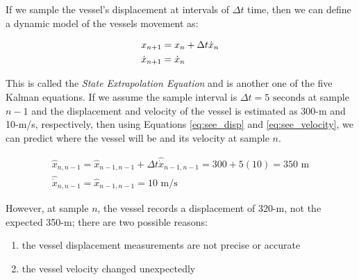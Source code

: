         If we sample the vessel's displacement at intervals of $\Delta t$ time, then we can define a dynamic model of the vessels movement as:

        \begin{subequations}
            \labeq{see_dynamic_model}
            \begin{align}
                x_{n+1} &= x_n + \Delta t \dot{x}_n \labeq{see_disp}\\
                \dot{x}_{n+1} &= \dot{x}_n \labeq{see_velocity}
            \end{align}
        \end{subequations}

        This is called the \textit{State Extrapolation Equation}  and is another one of the five Kalman equations.
        If we assume the sample interval is $\Delta t = 5 \text{ seconds}$ at sample $n-1$ and the displacement and velocity of the vessel is estimated as 300-m and 10-m/s, respectively, then using Equations \ref{eq:see_disp} and \ref{eq:see_velocity}, we can predict where the vessel will be and its velocity at sample $n$.
        
        \begin{equation*}
            \begin{gathered}
                \hat{x}_{n,n-1} = \hat{x}_{n-1,n-1} + \Delta t \hat{\dot{x}}_{n-1,n-1} = 300 + 5(10) = 350 \text{ m} \\
                \hat{\dot{x}}_{n,n-1} = \hat{x}_{n-1,n-1} = 10 \text{ m/s}
            \end{gathered}
        \end{equation*}

        However, at sample $n$, the vessel records a displacement of 320-m, not the expected 350-m; there are two possible reasons:

        \begin{enumerate}
            \item the vessel displacement measurements are not precise or accurate
            \item the vessel velocity changed unexpectedly 
        \end{enumerate}

